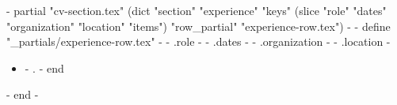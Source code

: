 {{- partial "cv-section.tex" (dict "section" "experience" "keys" (slice "role" "dates" "organization" "location" "items") "row_partial" "experience-row.tex") -}}
{{- define "_partials/experience-row.tex" -}}
\subheading
{ {{- .role -}} }{ {{- .dates -}} }{ {{- .organization -}} }{ {{- .location -}} }
\begin{itemize}
{{- range .items }}
\item\small{ {{- . }} \vspace{-2pt}}
{{- end }}
\end{itemize}\vspace{-5pt}
{{- end -}}
